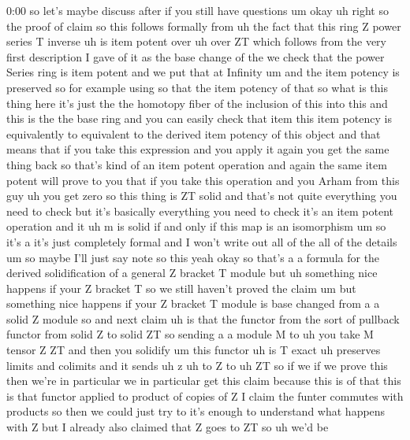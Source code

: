 \begin{unfinished}{0:00}
so  let's  maybe  discuss  after  if  you
still  have
questions  um  okay  uh  right  so  the  proof
of
claim  so  this  follows
formally
from  uh  the  fact  that  this  ring  Z  power
series  T  inverse  uh  is  item  potent
over
uh  over
ZT  which  follows  from  the  very  first
description  I  gave  of  it  as  the  base
change  of  the  we  check  that  the  power
Series  ring  is  item  potent  and  we  put
that  at  Infinity  um  and  the  item  potency
is
preserved  so  for  example  using  so  that
the  item  potency  of  that  so  what  is  this
thing  here  it's  just  the  the  homotopy
fiber  of  the  inclusion  of  this  into  this
and  this  is  the  the  base  ring  and  you
can  easily  check  that  item  this  item
potency  is  equivalently  to  equivalent  to
the  derived  item  potency  of  this  object
and  that  means  that  if  you  take  this
expression  and  you  apply  it  again  you
get  the  same  thing  back  so  that's  kind
of  an  item  potent  operation  and  again
the  same  item  potent  will  prove  to  you
that  if  you  take  this  operation  and  you
Arham  from  this  guy  uh  you  get  zero  so
this  thing  is  ZT  solid  and  that's  not
quite  everything  you  need  to  check  but
it's  basically  everything  you  need  to
check  it's  an  item  potent  operation  and
it  uh  m  is  solid  if  and  only  if  this  map
is  an
isomorphism  um
so  it's  a  it's  just  completely  formal
and  I  won't  write  out  all  of  the  all  of
the
details  um  so  maybe  I'll  just  say  note
so
this
yeah
okay  so  that's  a  a  formula  for  the
derived  solidification  of  a  general  Z
bracket  T  module  but  uh  something  nice
happens  if  your  Z  bracket  T  so  we  still
haven't  proved  the  claim  um  but
something  nice  happens  if  your  Z  bracket
T  module  is  base  changed  from  a  a  solid
Z  module
so  and  next
claim  uh  is  that  the  functor
from
the  sort  of  pullback  functor  from  solid
Z  to  solid  ZT  so  sending  a  a  module  M  to
uh  you  take  M  tensor  Z  ZT  and  then  you
solidify  um  this  functor  uh  is  T
exact  uh
preserves  limits  and
colimits  and  it  sends
uh  z  uh  to
Z  to  uh
ZT  so  if  we  if  we  prove  this  then  we're
in  particular  we  in  particular  get  this
claim  because  this  is  of  that  this  is
that  functor  applied  to  product  of
copies  of  Z  I  claim  the  funter  commutes
with  products  so  then  we  could  just  try
to  it's  enough  to  understand  what
happens  with  Z  but  I  already  also
claimed  that  Z  goes  to  ZT  so  uh  we'd  be

\end{unfinished}
